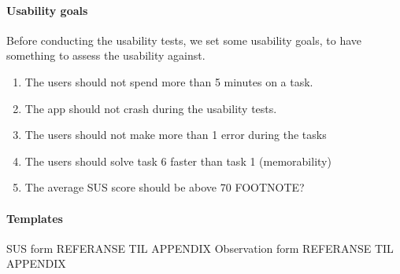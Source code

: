 		\paragraph{Usability goals}
		Before conducting the usability tests, we set some usability goals, to have something to assess the usability against.
		\begin{enumerate}
			\item{}The users should not spend more than 5 minutes on a task.
			\item{}The app should not crash during the usability tests.
			\item{}The users should not make more than 1 error during the tasks
			\item{}The users should solve task 6 faster than task 1 (memorability)
			\item{}The average SUS score should be above 70 FOOTNOTE?
		\end{enumerate}
		\paragraph{Templates}
			SUS form REFERANSE TIL APPENDIX
			\newline\newline
			Observation form REFERANSE TIL APPENDIX

